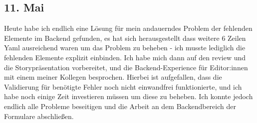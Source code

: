 \subsection{11. Mai}
Heute habe ich endlich eine Lösung für mein andauerndes Problem der fehlenden Elemente im Backend gefunden, es hat sich herausgestellt dass weitere 6 Zeilen Yaml ausreichend waren um das Problem zu beheben - ich musste lediglich die fehlenden Elemente explizit einbinden. Ich habe mich dann auf den review und die Storypräsentation vorbereitet, und die Backend-Experience für Editor:innen mit einem meiner Kollegen besprochen. Hierbei ist aufgefallen, dass die Validierung für benötigte Fehler noch nicht einwandfrei funktionierte, und ich habe noch einige Zeit investieren müssen um diese zu beheben. Ich konnte jedoch endlich alle Probleme beseitigen und die Arbeit an dem Backendbereich der Formulare abschließen.